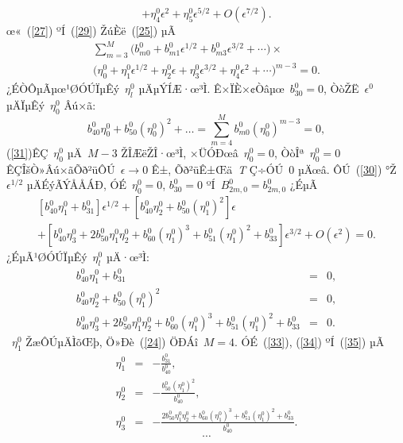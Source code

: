 \documentclass[12pt,openany,CJK,oneside]{cctbook}
\begin{document}
{\begin{equation}
+\eta_{4}^{0}\epsilon^{2}+\eta_{5}^{0}\epsilon^{5/2}+O(\epsilon^{7/2}).
\end{equation}
œ«\ (\ref{27}) ºÍ\ (\ref{29}) ŽúÈë\ (\ref{25}) µÃ
\begin{multline}\label{30}
  \sum_{m=3}^{M}\Big(b_{m0}^{0}+b_{m1}^{0}\epsilon^{1/2}+b_{m3}^{0}\epsilon^{3/2}+\cdots\Big)\times \\
  \Big(\eta_{0}^{0}+\eta_{1}^{0}\epsilon^{1/2}+\eta_{2}^{0}\epsilon+\eta_{3}^{0}\epsilon^{3/2}+\eta_{4}^{0}\epsilon^{2}+\cdots \Big)^{m-3}=0.
\end{multline}
¿ÉÒÔµÃµœ¹ØÓÚÏµÊý\ $\eta_{l}^{0}$ µÄµÝÍÆ·œ³Ì. Ê×ÏÈ×¢Òâµœ\ $b_{30}^{0}=0$, ÒòŽË\ $\epsilon^{0}$ µÄÏµÊý\ $\eta^0_0$ Âú×ã:
\begin{equation}\label{31}
  b_{40}^{0}\eta_{0}^{0}+b_{50}^{0}(\eta_{0}^{0})^{2}+\dots=\sum_{m=4}^{M}b_{m0}^{0}(\eta_{0}^{0})^{m-3}=0,
\end{equation}
(\ref{31})ÊÇ\ $\eta_{0}^{0}$ µÄ\ $M-3$ ŽÎÆëŽÎ·œ³Ì, ×ÜÓÐœâ\ $\eta_{0}^{0}=0$, ÒòÎª\ $\eta_{0}^{0}=0$ ÊÇÎšÒ»Âú×ãÕð²üÔÚ\ $\epsilon\rightarrow0$ Ê±, Õð²üÊ±Œä\ \emph{T} Ç÷ÓÚ\ 0 µÄœâ. ÔÚ\ (\ref{30}) °Ž\ $\epsilon^{1/2}$ µÄÉýÃÝÅÅÁÐ, ÓÉ\ $\eta_{0}^{0}=0$, $b_{30}^{0}=0$ ºÍ\ $B_{2m,0}^{0}=b_{2m,0}^{0}$ ¿ÉµÃ
\begin{multline}\label{32}
 [b_{40}^{0}\eta_{1}^{0}+b_{31}^{0}]\epsilon^{1/2}+[b_{40}^{0}\eta_{2}^{0}+b_{50}^{0}(\eta_1^0)^2]\epsilon \\
 +[b_{40}^{0}\eta_{3}^{0}+2b_{50}^{0}\eta_1^0\eta_2^0+ b_{60}^{0}(\eta_{1}^{0})^{3}+ b_{51}^{0}(\eta_{1}^{0})^{2}+b_{33}^{0}]\epsilon^{3/2}+O(\epsilon^{2})=0.
\end{multline}
¿ÉµÃ¹ØÓÚÏµÊý\ $\eta_{l}^{0}$ µÄ·œ³Ì:
\begin{eqnarray}
  b_{40}^{0}\eta_{1}^{0}+b_{31}^{0} &=& 0,\label{33} \\
  b_{40}^{0}\eta_{2}^{0}+b_{50}^{0}(\eta_1^0)^2 &=& 0, \label{34}\\
  b_{40}^{0}\eta_{3}^{0}+2b_{50}^{0}\eta_1^0\eta_2^0+ b_{60}^{0}(\eta_{1}^{0})^{3}+ b_{51}^{0}(\eta_{1}^{0})^{2}+b_{33}^{0} &=& 0.\label{35}
\end{eqnarray}
 \ $\eta_{1}^{0}$ ŽæÔÚµÄÌõŒþ, Ö»Ðè\ (\ref{24}) ÖÐÁî\ $M = 4$. ÓÉ\ (\ref{33}), (\ref{34}) ºÍ\ (\ref{35}) µÃ
 \begin{eqnarray}
  \eta_{1}^{0} &=& -\frac{b_{31}^{0}}{b_{40}^{0}},\label{36} \\
   \eta_{2}^{0} &=& -\frac{b_{50}^{0}(\eta_1^0)^2}{b_{40}^{0}}, \\
   \eta_{3}^{0} &=& -\frac{2b_{50}^{0}\eta_1^0\eta_2^0+b_{60}^{0}(\eta_{1}^{0})^{3}+ b_{51}^{0}(\eta_{1}^{0})^{2}+b_{33}^{0}}{b_{40}^{0}}.
 \end{eqnarray}
$$\cdots$$

}
\end{document}

